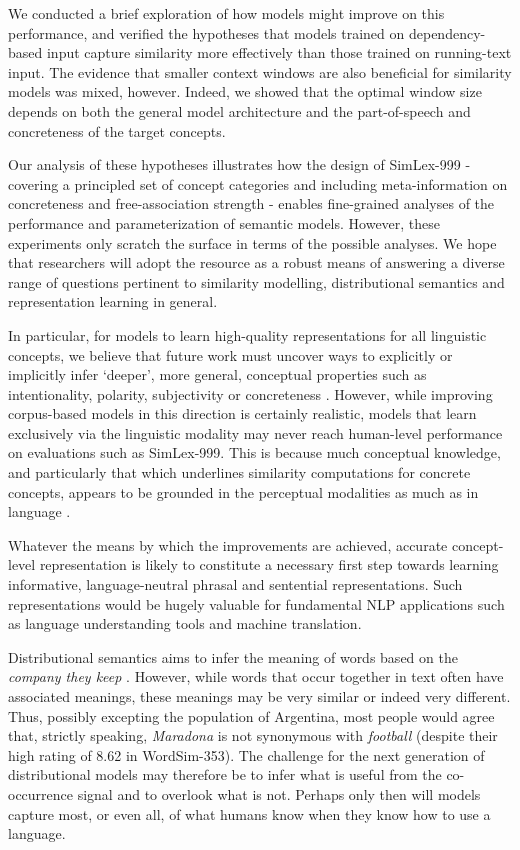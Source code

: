 We conducted a brief exploration of how models might improve on this performance, and verified the hypotheses that models trained on dependency-based input capture similarity more effectively than those trained on running-text input. The evidence that smaller context windows are also beneficial for similarity models was mixed, however. Indeed, we showed that the optimal window size depends on both the general model architecture and the part-of-speech and concreteness of the target concepts. 

Our analysis of these hypotheses illustrates how the design of SimLex-999 - covering a principled set of concept categories and including meta-information on concreteness and free-association strength - enables fine-grained analyses of the performance and parameterization  of semantic models. However, these experiments only scratch the surface in terms of the possible analyses. We hope that researchers will adopt the resource as a robust means of answering a diverse range of questions pertinent to similarity modelling, distributional semantics and representation learning in general.  

In particular, for models to learn high-quality representations for all linguistic concepts, we believe that future work must uncover ways to explicitly or implicitly infer `deeper', more general, conceptual properties such as intentionality, polarity, subjectivity or concreteness \cite{gershmanmetaphor}. However, while improving corpus-based models in this direction is certainly realistic, models that learn exclusively via the linguistic modality may never reach human-level performance on evaluations such as SimLex-999. This is because much conceptual knowledge, and particularly that which underlines similarity computations for concrete concepts, appears to be grounded in the perceptual modalities as much as in language \cite{barsalou2003grounding}. 

Whatever the means by which the improvements are achieved, accurate concept-level representation is likely to constitute a necessary first step towards learning informative, language-neutral phrasal and sentential representations. Such representations would be hugely valuable for fundamental NLP applications such as language understanding tools and machine translation. 

Distributional semantics aims to infer the meaning of words based on the \emph{company they keep} \cite{dist}. However, while words that occur together in text often have associated meanings, these meanings may be very similar or indeed very different. Thus, possibly excepting the population of Argentina, most people would agree that, strictly speaking, \emph{Maradona} is not synonymous with \emph{football} (despite their high rating of 8.62 in WordSim-353). The challenge for the next generation of distributional models may therefore be to infer what is useful from the co-occurrence signal and to overlook what is not. Perhaps only then will models capture most, or even all, of what humans know when they know how to use a language. 


